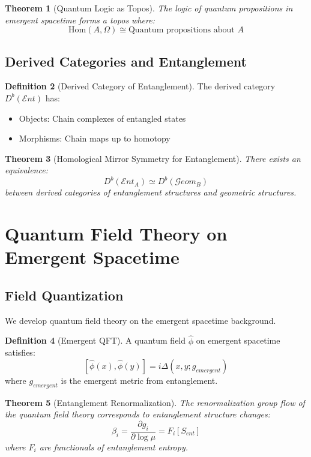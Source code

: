 \documentclass[12pt,a4paper]{article}
\newcommand{\Hom}{\mathrm{Hom}}
\theoremstyle{plain}
\newtheorem{theorem}{Theorem}[section]
\theoremstyle{definition}
\newtheorem{definition}[theorem]{Definition}
\theoremstyle{remark}
\begin{document}
\begin{theorem}[Quantum Logic as Topos]
The logic of quantum propositions in emergent spacetime forms a topos where:
\[\Hom(A, \Omega) \cong \text{Quantum propositions about } A\]
\end{theorem}

\subsection{Derived Categories and Entanglement}

\begin{definition}[Derived Category of Entanglement]
The derived category $D^b(\mathcal{E}nt)$ has:
\begin{itemize}
\item Objects: Chain complexes of entangled states
\item Morphisms: Chain maps up to homotopy
\end{itemize}
\end{definition}

\begin{theorem}[Homological Mirror Symmetry for Entanglement]
There exists an equivalence:
\[D^b(\mathcal{E}nt_A) \simeq D^b(\mathcal{G}eom_B)\]
between derived categories of entanglement structures and geometric structures.
\end{theorem}

\section{Quantum Field Theory on Emergent Spacetime}

\subsection{Field Quantization}

We develop quantum field theory on the emergent spacetime background.

\begin{definition}[Emergent QFT]
A quantum field $\hat{\phi}$ on emergent spacetime satisfies:
\[[\hat{\phi}(x), \hat{\phi}(y)] = i\Delta(x,y; g_{emergent})\]
where $g_{emergent}$ is the emergent metric from entanglement.
\end{definition}

\begin{theorem}[Entanglement Renormalization]
The renormalization group flow of the quantum field theory corresponds to entanglement structure changes:
\[\beta_i = \frac{\partial g_i}{\partial \log \mu} = F_i[S_{ent}]\]
where $F_i$ are functionals of entanglement entropy.
\end{theorem}
\end{document}
